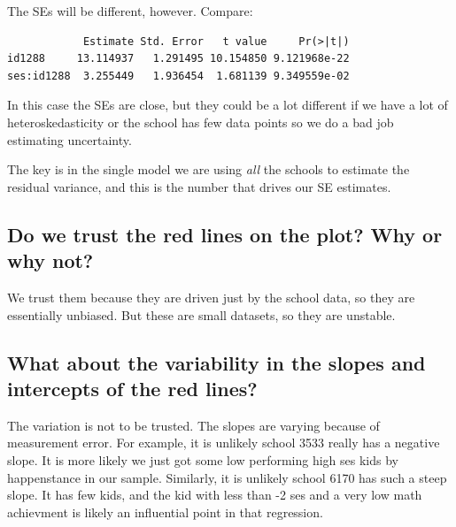 \documentclass[
  letterpaper,
  DIV=11,
  numbers=noendperiod]{scrreprt}
\newenvironment{Shaded}{}{}
\newcommand{\DecValTok}[1]{\textcolor[rgb]{0.25,0.63,0.44}{#1}}
\newcommand{\FunctionTok}[1]{\textcolor[rgb]{0.02,0.16,0.49}{#1}}
\newcommand{\NormalTok}[1]{#1}
\newcommand{\OtherTok}[1]{\textcolor[rgb]{0.00,0.44,0.13}{#1}}
\newcommand{\SpecialCharTok}[1]{\textcolor[rgb]{0.25,0.44,0.63}{#1}}
\begin{document}
The SEs will be different, however. Compare:

\begin{Shaded}
\end{Shaded}

\begin{verbatim}
            Estimate Std. Error   t value     Pr(>|t|)
id1288     13.114937   1.291495 10.154850 9.121968e-22
ses:id1288  3.255449   1.936454  1.681139 9.349559e-02
\end{verbatim}

In this case the SEs are close, but they could be a lot different if we
have a lot of heteroskedasticity or the school has few data points so we
do a bad job estimating uncertainty.

The key is in the single model we are using \emph{all} the schools to
estimate the residual variance, and this is the number that drives our
SE estimates.

\subsection{Do we trust the red lines on the plot? Why or why
not?}\label{do-we-trust-the-red-lines-on-the-plot-why-or-why-not}

We trust them because they are driven just by the school data, so they
are essentially unbiased. But these are small datasets, so they are
unstable.

\subsection{What about the variability in the slopes and intercepts of
the red
lines?}\label{what-about-the-variability-in-the-slopes-and-intercepts-of-the-red-lines}

The variation is not to be trusted. The slopes are varying because of
measurement error. For example, it is unlikely school 3533 really has a
negative slope. It is more likely we just got some low performing high
ses kids by happenstance in our sample. Similarly, it is unlikely school
6170 has such a steep slope. It has few kids, and the kid with less than
-2 ses and a very low math achievment is likely an influential point in
that regression.
\end{document}
